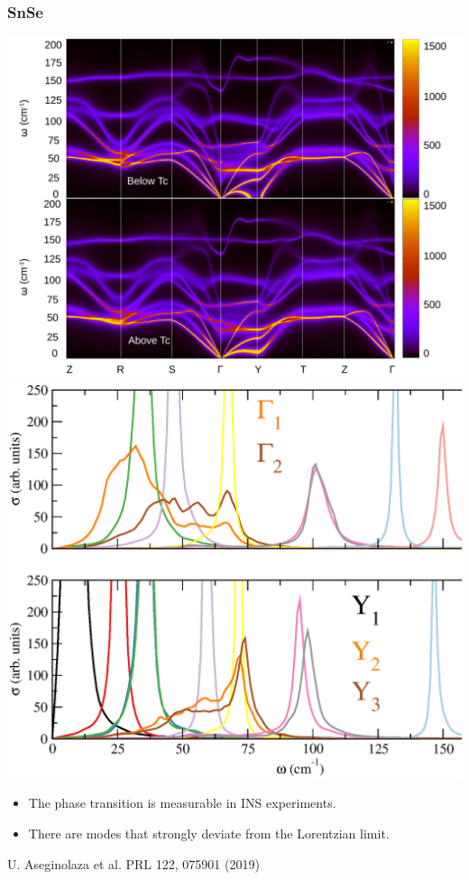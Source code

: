 \documentclass{beamer}
\begin{document}
\begin{frame}

\frametitle{SnSe}
\begin{center}
 \includegraphics[width=0.49\linewidth]{Pictures/SnSe/full-ins.pdf}
 \includegraphics[width=0.49\linewidth]{Pictures/SnSe/ins.eps}
\end{center}
\begin{itemize}
 \item The phase transition is measurable in INS experiments.
 \item There are modes that strongly deviate from the Lorentzian limit.
\end{itemize}
\begin{tiny}
 U. Aseginolaza et al. PRL 122, 075901 (2019)
\end{tiny}

\end{frame}

\end{document}
